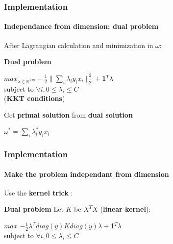 \documentclass{beamer}
\begin{document}
\begin{frame}
\frametitle{Implementation}
\framesubtitle{Independance from dimension: \textbf{dual problem}}

After Lagrangian calculation and minimization in $\omega$: 

\bigskip
\pause

\begin{block}{\textbf{Dual problem}}
             \begin{center}
             $max_{\lambda \in \mathbb{R}^{+m}} -\frac{1}{2}\|\sum_i\lambda_iy_ix_i\|^2_2 + $\textbf{1}$^T\lambda$\\ 
             subject to $\forall i, 0 \leq \lambda_i \leq C$\\
          
             (\textbf{KKT conditions})
             \end{center}
\end{block}

\pause

\begin{alertblock}{Get \textbf{primal solution} from \textbf{dual solution}}
             \begin{center}
               $\omega^{*} = \sum_i \lambda^{*}_i y_i x_i$
             \end{center}
\end{alertblock}

\end{frame}

\begin{frame}
\frametitle{Implementation}
\framesubtitle{Make the problem independant from dimension}

Use the \textbf{kernel trick} :

\bigskip

\begin{block}{\textbf{Dual problem}}
Let $K$ be $X^TX$ (\textbf{linear kernel}):

\bigskip
                 \begin{center}
                 $max$ $-\frac{1}{2}\lambda^Tdiag(y)Kdiag(y)\lambda+$\textbf{1}$^T\lambda$\\
                 subject to $\forall i, 0 \leq \lambda_i \leq C$ 
                 \end{center}
\end{block}

\end{frame}
\end{document}
